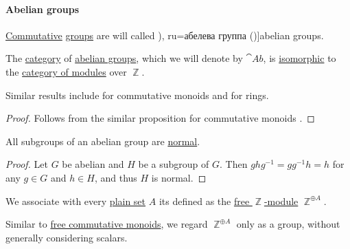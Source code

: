 \paragraph{Abelian groups}

\begin{definition}\label{def:abelian_group}
  \hyperref[def:binary_operation/commutative]{Commutative} \hyperref[def:group]{groups} are will called \term[bg=абелева группа (\cite[390]{Обрешков1962ВисшаАлгебра}), ru=абелева группа (\cite[def. 1.1.1]{Винберг2014Алгебра})]{abelian groups}.
\end{definition}

\begin{proposition}\label{thm:category_of_abelian_groups}
  The \hyperref[def:category]{category} of \hyperref[def:abelian_group]{abelian groups}, which we will denote by \( \cat{Ab} \), is \hyperref[rem:category_similarity/isomorphism]{isomorphic} to the \hyperref[def:module/category]{category of modules} over \( \BbbZ \).
\end{proposition}
\begin{comments}
  \item Similar results include  for commutative monoids and  for rings.
\end{comments}
\begin{proof}
  Follows from the similar proposition for commutative monoids .
\end{proof}

\begin{proposition}\label{thm:abelian_normal_subgroups}
  All subgroups of an abelian group are \hyperref[def:normal_subgroup]{normal}.
\end{proposition}
\begin{proof}
  Let \( G \) be abelian and \( H \) be a subgroup of \( G \). Then \( g h g^{-1} = gg^{-1} h = h \) for any \( g \in G \) and \( h \in H \), and thus \( H \) is normal.
\end{proof}

\begin{definition}\label{def:free_abelian_group}\mimprovised
  We associate with every \hyperref[def:set]{plain set} \( A \) its  defined as the \hyperref[def:free_semimodule]{free \( \BbbZ \)-module} \( \BbbZ^{\oplus A} \).
\end{definition}
\begin{comments}
  \item Similar to \hyperref[def:free_commutative_monoid]{free commutative monoids}, we regard \( \BbbZ^{\oplus A} \) only as a group, without generally considering scalars.
\end{comments}

